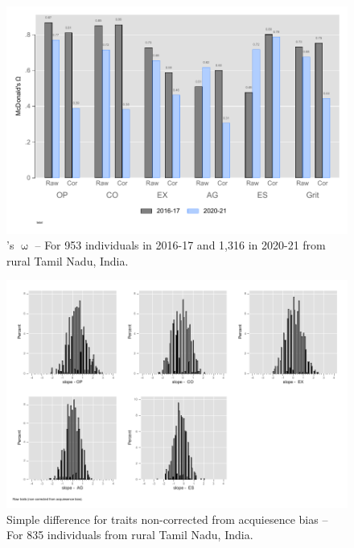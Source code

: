 \documentclass[a4paper, 12pt, onecolumn]{article}
\begin{document}
\begin{figure}[!h]
\raggedright
\includegraphics[scale=0.8]{INPUT/omega_total}
\caption{\citeauthor{McDonald1999}'s $\upomega$ -- For 953 individuals in 2016-17 and 1,316 in 2020-21 from rural Tamil Nadu, India.}
\label{fig:omega}
\end{figure}

\begin{figure}[!h]
\raggedright
\includegraphics[scale=0.8]{INPUT/diffcont_raw}
\caption{Simple difference for traits non-corrected from acquiesence bias -- For 835 individuals from rural Tamil Nadu, India.}
\label{fig:diffraw}
\end{figure}
\end{document}
